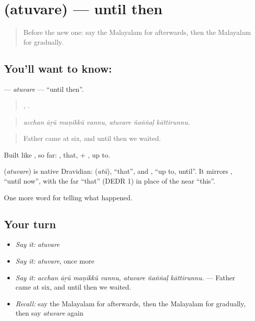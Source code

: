 \section[\texorpdfstring{\ml{അതുവരെ} (atuvare)}{അതുവരെ (atuvare)}]{ (atuvare) — until then}

\label{lesson:ML-C357-atuvare}



\begin{quote}
Before the new one: say the Malayalam for afterwards, then the Malayalam for gradually.
\end{quote}

\subsection*{You'll want to know: }
\textbf{} — \emph{atuvare} — \textquotedblleft{}until then\textquotedblright{}.

\begin{quote}
   ,   .
\end{quote}

\begin{quote}
\emph{acchan āṟŭ maṇikkŭ vannu, atuvare ñaṅṅaḷ kāttirunnu.}
\end{quote}

\begin{quote}
Father came at six, and until then we waited.
\end{quote}

Built like , so far: , that, + , up to.

\begin{cousinweb}
\textbf{} (\emph{atuvare}) is native Dravidian:  (\emph{atŭ}), \textquotedblleft{}that\textquotedblright{}, and , \textquotedblleft{}up to, until\textquotedblright{}. It mirrors , \textquotedblleft{}until now\textquotedblright{}, with the far \textquotedblleft{}that\textquotedblright{} (DEDR 1) in place of the near \textquotedblleft{}this\textquotedblright{}.
\end{cousinweb}

\begin{grammarlens}[title={What you've built}]
One more word for telling what happened.
\end{grammarlens}

\subsection*{Your turn}
\begin{itemize}
\raggedright
  \item \emph{Say it:} \emph{atuvare}
  \item \emph{Say it:} \emph{atuvare}, once more
  \item \emph{Say it:} \emph{acchan āṟŭ maṇikkŭ vannu, atuvare ñaṅṅaḷ kāttirunnu.} — Father came at six, and until then we waited.
  \item \emph{Recall:} say the Malayalam for afterwards, then the Malayalam for gradually, then say \emph{atuvare} again
\end{itemize}

